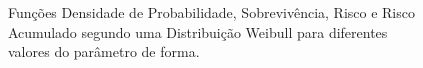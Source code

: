 \documentclass[
  12pt,
  letterpaper,
  DIV=11,
  numbers=noendperiod]{scrreprt}
\begin{document}
\begin{figure}[H]

\caption{\label{fig-CurvasWeibull}Funções Densidade de Probabilidade,
Sobrevivência, Risco e Risco Acumulado segundo uma Distribuição Weibull
para diferentes valores do parâmetro de forma.}

\begin{minipage}{0.50\linewidth}



\end{minipage}%
%
\begin{minipage}{0.50\linewidth}

\end{minipage}
\end{figure}
\end{document}
